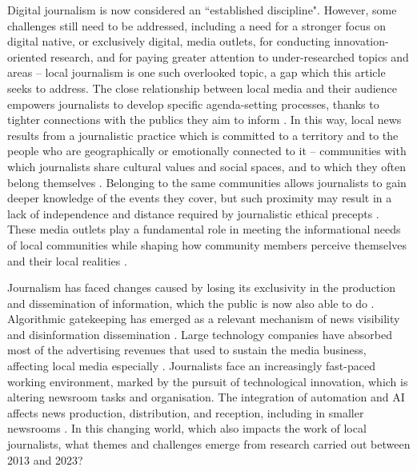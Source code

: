 \documentclass[english]{textolivre}
\begin{document}
Digital journalism is now considered an ``established discipline". However, some challenges still need to be addressed, including a need for a stronger focus on digital native, or exclusively digital, media outlets, for conducting innovation-oriented research, and for paying greater attention to under-researched topics and areas \cite{salaverria2019} -- local journalism is one such overlooked topic, a gap which this article seeks to address. The close relationship between local media and their audience empowers journalists to develop specific agenda-setting processes, thanks to tighter connections with the publics they aim to inform \cite{correia2019fake}. In this way, local news results from a journalistic practice which is committed to a territory and to the people who are geographically or emotionally connected to it -- communities with which journalists share cultural values and social spaces, and to which they often belong themselves \cite{camponez2002, lopez-garcia2008}. Belonging to  the same communities allows journalists to gain deeper knowledge of the events they cover, but such proximity may result in a lack of independence and distance required by journalistic ethical precepts \cite{jeronimo2015}. These media outlets play a fundamental role in meeting the informational needs of local communities while shaping how community members perceive themselves and their local realities \cite{nielsen2015}.

Journalism has faced changes caused by losing its exclusivity in the production and dissemination of information, which the public is now also able to do \cite{castells2015}. Algorithmic gatekeeping has emerged as a relevant mechanism of news visibility and disinformation dissemination \cite{cardoso2023}. Large technology companies have absorbed most of the advertising revenues that used to sustain the media business, affecting local media especially \cite{costa2014}. Journalists face an increasingly fast-paced working environment, marked by the pursuit of technological innovation, which is altering newsroom tasks and organisation. The integration of automation and AI affects news production, distribution, and reception, including in smaller newsrooms \cite{goncalves2024}. In this changing world, which also impacts the work of local journalists, what themes and challenges emerge from research carried out between 2013 and 2023?
\end{document}
